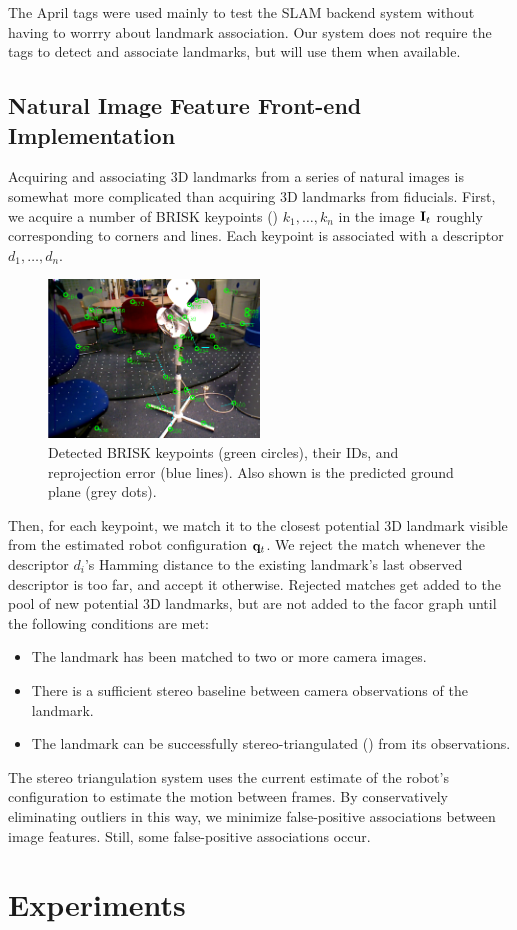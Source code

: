 The April tags were used mainly to test the SLAM backend system without having to worrry about landmark association. Our system does not require the tags to detect and associate landmarks, but will use them when available.

\subsection{Natural Image Feature Front-end Implementation}

Acquiring and associating 3D landmarks from a series of natural images is somewhat more complicated than acquiring 3D landmarks from fiducials. First, we acquire a number of BRISK keypoints () $k_1, \ldots, k_n$ in the image $\mathbf{I}_t$ roughly corresponding to corners and lines. Each keypoint is associated with a descriptor $d_1, \ldots, d_n$. 

\begin{figure}
	\centering
	\includegraphics[width=0.5\textwidth]{img/graph_slam/brisk_features}
	\caption{Detected BRISK keypoints (green circles), their IDs, and reprojection error (blue lines). Also shown is the predicted ground plane (grey dots).}
	\label{fig:brisk_detections}
\end{figure}

Then, for each keypoint, we match it to the closest potential 3D landmark visible from the estimated robot configuration $\mathbf{q}_t$. We reject the match whenever the descriptor $d_i$'s Hamming distance to the existing landmark's last observed descriptor is too far, and accept it otherwise. Rejected matches get added to the pool of new potential 3D landmarks, but are not added to the facor graph until the following conditions are met:

\begin{itemize}
  \item The landmark has been matched to two or more camera images.
  \item There is a sufficient stereo baseline between camera observations of the landmark.
  \item The landmark can be successfully stereo-triangulated () from its observations.
\end{itemize} 

The stereo triangulation system uses the current estimate of the robot's configuration to estimate the motion between frames. By conservatively eliminating outliers in this way, we minimize false-positive associations between image features. Still, some false-positive associations occur.

\section{Experiments}